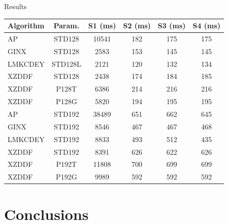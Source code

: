 \documentclass[aspectratio=169]{beamer}
\begin{document}
\begin{frame}{Results}
    \begin{table}[ht]
        \centering
        \begin{tabular}{lc|cccc}
        \toprule
        \textbf{Algorithm} & \textbf{Param.} & \textbf{S1} (ms)  & \textbf{S2} (ms) & \textbf{S3} (ms) & \textbf{S4} (ms) \\
        \midrule
        AP & STD128 & 10541 & 182 & 175 & 175 \\
        GINX & STD128 & 2583 & 153 & 145 & 145 \\
        LMKCDEY & STD128L & 2121 & 120 & 132 & 134 \\
        XZDDF & STD128 & 2438 & 174 & 184 & 185 \\
        XZDDF & P128T & 6386 & 214 & 216 & 216 \\
        XZDDF & P128G & 5820 & 194 & 195 & 195 \\
        AP & STD192 & 38489 & 651 & 662 & 645 \\
        GINX & STD192 & 8546 & 467 & 467 & 468 \\
        LMKCDEY & STD192 & 8833 & 493 & 512 & 435 \\
        XZDDF & STD192 & 8391 & 626 & 622 & 626 \\
        XZDDF & P192T & 11808 & 700 & 699 & 699 \\
        XZDDF & P192G & 9989 & 592 & 592 & 592 \\
        \bottomrule
        \end{tabular}
        \label{tab:efficiency_res}
    \end{table}
\end{frame}


\section{Conclusions}
\end{document}
